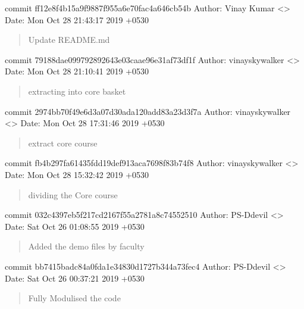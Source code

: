 \documentclass[letterpaper,10pt,english]{sphinxmanual}
\begin{document}
commit ff12e8f4b15a9f9887f955a6e70fac4a646cb54b
Author: Vinay Kumar \textless{}\textgreater{}
Date:   Mon Oct 28 21:43:17 2019 +0530
\begin{quote}

Update README.md
\end{quote}

commit 79188dae099792892643e03caae96e31af73df1f
Author: vinayskywalker \textless{}\textgreater{}
Date:   Mon Oct 28 21:10:41 2019 +0530
\begin{quote}

extracting into core basket
\end{quote}

commit 2974bb70f49e6d3a07d30ada120add83a23d3f7a
Author: vinayskywalker \textless{}\textgreater{}
Date:   Mon Oct 28 17:31:46 2019 +0530
\begin{quote}

extract core course
\end{quote}

commit fb4b297fa61435fdd19def913aca7698f83b74f8
Author: vinayskywalker \textless{}\textgreater{}
Date:   Mon Oct 28 15:32:42 2019 +0530
\begin{quote}

dividing the Core course
\end{quote}

commit 032c4397eb5f217cd2167f55a2781a8c74552510
Author: PS-Ddevil \textless{}\textgreater{}
Date:   Sat Oct 26 01:08:55 2019 +0530
\begin{quote}

Added the demo files by faculty
\end{quote}

commit bb7415badc84a0fda1e34830d1727b344a73fec4
Author: PS-Ddevil \textless{}\textgreater{}
Date:   Sat Oct 26 00:37:21 2019 +0530
\begin{quote}

Fully Modulised the code
\end{quote}
\end{document}
